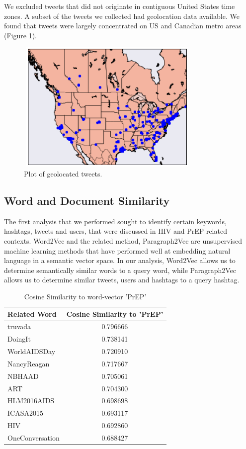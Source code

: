 \documentclass{sig-alternate-05-2015}
\begin{document}
We excluded tweets that did not originate in contiguous United States time zones. A subset of the tweets we collected had geolocation data available. We found that tweets were largely concentrated on US and Canadian metro areas (Figure 1).



\begin{figure}
\centering
\includegraphics[height=2.5in, width=3.5in]{map}
\caption{Plot of geolocated tweets.}
\end{figure}

\subsection{Word and Document Similarity}

The first analysis that we performed sought to identify certain keywords, hashtags, tweets and users, that were discussed in HIV and PrEP related contexts. Word2Vec and the related method, Paragraph2Vec are unsupervised machine learning methods that have performed well at embedding natural language in a semantic vector space. In our analysis, Word2Vec allows us to determine semantically similar words to a query word, while Paragraph2Vec allows us to determine similar tweets, users and hashtags to a query hashtag.

\begin{table}
\centering
\caption{Cosine Similarity to word-vector 'PrEP'}
\begin{tabular}{|l|c|} \hline
Related Word & Cosine Similarity to 'PrEP'\\ \hline
truvada & 0.796666\\ \hline
DoingIt & 0.738141\\ \hline
WorldAIDSDay & 0.720910\\ \hline
NancyReagan & 0.717667\\ \hline
NBHAAD & 0.705061\\ \hline
ART & 0.704300\\ \hline
HLM2016AIDS & 0.698698\\ \hline
ICASA2015 & 0.693117\\ \hline
HIV & 0.692860\\ \hline
OneConversation & 0.688427\\ \hline
\hline\end{tabular}
\end{table}
\end{document}

